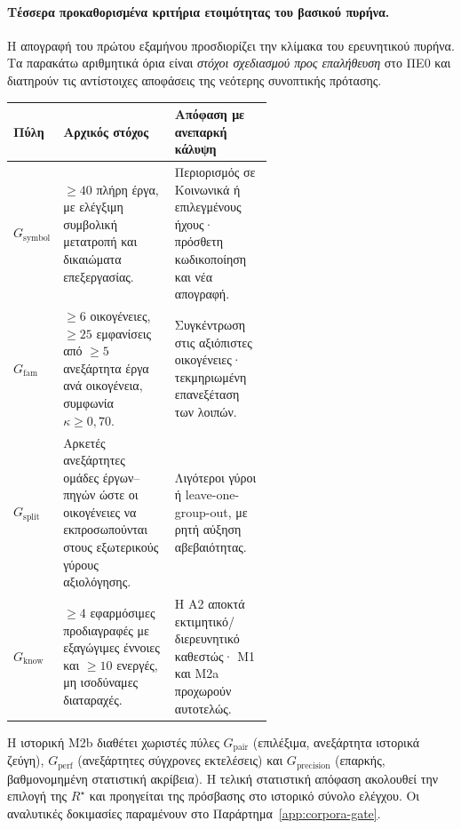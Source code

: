 \documentclass[11pt,a4paper]{article}
\begin{document}
\paragraph{Τέσσερα προκαθορισμένα κριτήρια ετοιμότητας του βασικού πυρήνα.}
Η απογραφή του πρώτου εξαμήνου προσδιορίζει την κλίμακα του ερευνητικού πυρήνα. Τα παρακάτω αριθμητικά όρια είναι \emph{στόχοι σχεδιασμού προς επαλήθευση} στο ΠΕ0 και διατηρούν τις αντίστοιχες αποφάσεις της νεότερης συνοπτικής πρότασης.
\begin{center}\small
\begin{tabularx}{\linewidth}{@{}p{0.15\linewidth}p{0.43\linewidth}Y@{}}
\toprule
\textbf{Πύλη} & \textbf{Αρχικός στόχος} & \textbf{Απόφαση με ανεπαρκή κάλυψη}\\
\midrule
$G_{\mathrm{symbol}}$ & $\ge40$ πλήρη έργα, με ελέγξιμη συμβολική μετατροπή και δικαιώματα επεξεργασίας. & Περιορισμός σε Κοινωνικά ή επιλεγμένους ήχους· πρόσθετη κωδικοποίηση και νέα απογραφή.\\
$G_{\mathrm{fam}}$ & $\ge6$ οικογένειες, $\ge25$ εμφανίσεις από $\ge5$ ανεξάρτητα έργα ανά οικογένεια, συμφωνία $\kappa\ge0{,}70$. & Συγκέντρωση στις αξιόπιστες οικογένειες· τεκμηριωμένη επανεξέταση των λοιπών.\\
$G_{\mathrm{split}}$ & Αρκετές ανεξάρτητες ομάδες έργων--πηγών ώστε οι οικογένειες να εκπροσωπούνται στους εξωτερικούς γύρους αξιολόγησης. & Λιγότεροι γύροι ή leave-one-group-out, με ρητή αύξηση αβεβαιότητας.\\
$G_{\mathrm{know}}$ & $\ge4$ εφαρμόσιμες προδιαγραφές με εξαγώγιμες έννοιες και $\ge10$ ενεργές, μη ισοδύναμες διαταραχές. & Η Α2 αποκτά εκτιμητικό/διερευνητικό καθεστώς· Μ1 και Μ2a προχωρούν αυτοτελώς.\\
\bottomrule
\end{tabularx}
\end{center}
Η ιστορική Μ2b διαθέτει χωριστές πύλες $G_{\mathrm{pair}}$ (επιλέξιμα, ανεξάρτητα ιστορικά ζεύγη), $G_{\mathrm{perf}}$ (ανεξάρτητες σύγχρονες εκτελέσεις) και $G_{\mathrm{precision}}$ (επαρκής, βαθμονομημένη στατιστική ακρίβεια). Η τελική στατιστική απόφαση ακολουθεί την επιλογή της $R^\star$ και προηγείται της πρόσβασης στο ιστορικό σύνολο ελέγχου. Οι αναλυτικές δοκιμασίες παραμένουν στο Παράρτημα~\ref{app:corpora-gate}.
\end{document}
